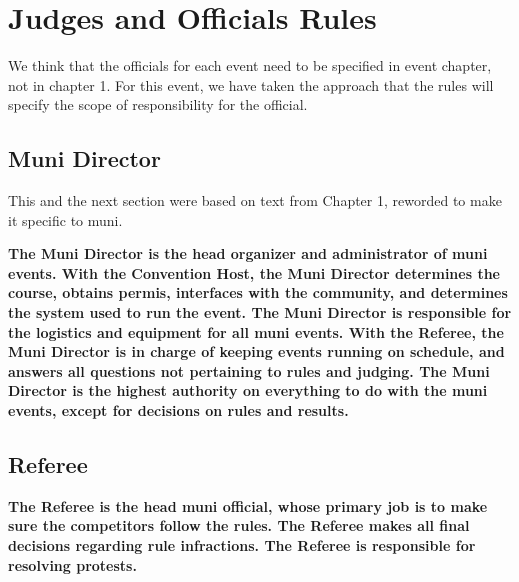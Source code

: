 \chapter{Judges and Officials Rules}

\begin{framed}
We think that the officials for each event need to be specified in event chapter, not in chapter 1. For this event, we have taken the approach that the rules will specify the scope of responsibility for the official.
\end{framed}

\section{Muni Director}

\begin{framed}
This and the next section were based on text from Chapter 1, reworded to make it specific to muni.
\end{framed}

\textbf{The Muni Director is the head organizer and administrator of muni
events.  With the Convention Host, the Muni Director determines the course,
obtains permis, interfaces with the community, and determines the system
used to run the event.  The Muni Director is responsible for the logistics and
equipment for all muni events.  With the Referee, the
Muni Director is in charge of keeping events running on schedule, and
answers all questions not pertaining to rules and judging.  The Muni
Director is the highest authority on everything to do with the muni
events, except for decisions on rules and results.}

\section{Referee}

\textbf{The Referee is the head muni official, whose primary job is to make sure
the competitors follow the rules.  The Referee makes all final decisions
regarding rule infractions. The Referee is responsible for resolving
protests.}

